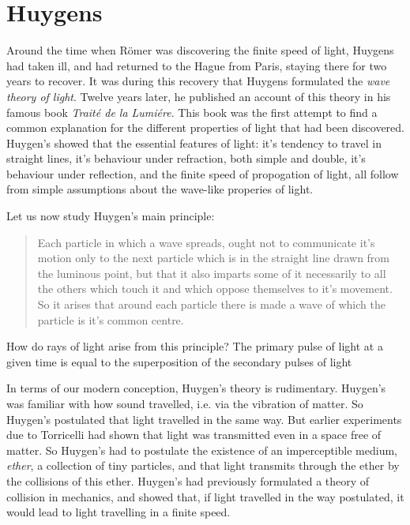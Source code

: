 \section{Huygens}

Around the time when R\"{o}mer was discovering the finite speed of light, Huygens had taken ill, and had returned to the Hague from Paris, staying there for two years to recover. It was during this recovery that Huygens formulated the \emph{wave theory of light}. Twelve years later, he published an account of this theory in his famous book \emph{Trait\'{e} de la Lumi\'{e}re}. This book was the first attempt to find a common explanation for the different properties of light that had been discovered. Huygen's showed that the essential features of light: it's tendency to travel in straight lines, it's behaviour under refraction, both simple and double, it's behaviour under reflection, and the finite speed of propogation of light, all follow from simple assumptions about the wave-like properies of light.

Let us now study Huygen's main principle:
%
\begin{quote}
    Each particle in which a wave spreads, ought not to communicate it's motion only to the next particle which is in the straight line drawn from the luminous point, but that it also imparts some of it necessarily to all the others which touch it and which oppose themselves to it's movement. So it arises that around each particle there is made a wave of which the particle is it's common centre.
\end{quote}
%
How do rays of light arise from this principle? The primary pulse of light at a given time is equal to the superposition of the secondary pulses of light




In terms of our modern conception, Huygen's theory is rudimentary. Huygen's was familiar with how sound travelled, i.e. via the vibration of matter. So Huygen's postulated that light travelled in the same way. But earlier experiments due to Torricelli had shown that light was transmitted even in a space free of matter. So Huygen's had to postulate the existence of an imperceptible medium, \emph{ether}, a collection of tiny particles, and that light transmits through the ether by the collisions of this ether. Huygen's had previously formulated a theory of collision in mechanics, and showed that, if light travelled in the way postulated, it would lead to light travelling in a finite speed.





